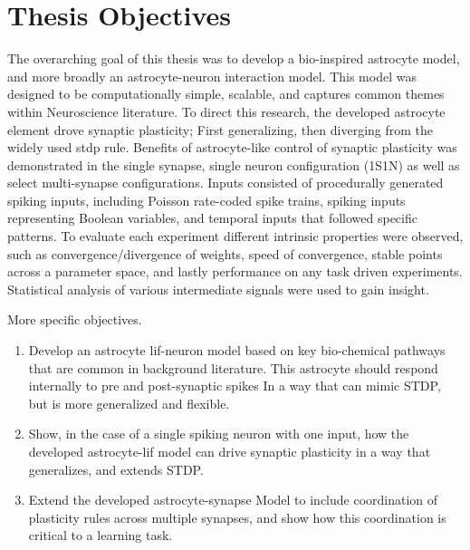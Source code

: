 \section{Thesis Objectives}
The overarching goal of this thesis was to develop a bio-inspired astrocyte
model, and more broadly an astrocyte-neuron interaction model. This model was
designed to be computationally simple, scalable, and captures common themes
within Neuroscience literature. To direct this research, the developed astrocyte
element drove synaptic plasticity; First generalizing, then diverging from the
widely used \gls{stdp} rule. Benefits of astrocyte-like control of synaptic plasticity
was demonstrated in the single synapse, single neuron configuration (1S1N) as
well as select multi-synapse configurations. Inputs consisted of procedurally
generated spiking inputs, including Poisson rate-coded spike trains, spiking
inputs representing Boolean variables, and temporal inputs that followed
specific patterns. To evaluate each experiment different intrinsic properties
were observed, such as convergence/divergence of weights, speed of convergence,
stable points across a parameter space, and lastly performance on any task
driven experiments. Statistical analysis of various intermediate signals were
used to gain insight.

More specific objectives.
\begin{enumerate}
\item Develop an astrocyte \gls{lif}-neuron model based on key bio-chemical
  pathways that are common in background literature. This astrocyte should
  respond internally to pre and post-synaptic spikes In a way that can mimic
  STDP, but is more generalized and flexible.

  \item Show, in the case of a single spiking neuron with one input, how the
    developed astrocyte-\gls{lif} model can drive synaptic plasticity in a way that
    generalizes, and extends STDP.

  \item Extend the developed astrocyte-synapse Model to include coordination of
    plasticity rules across multiple synapses, and show how this coordination is
    critical to a learning task.

\end{enumerate}
